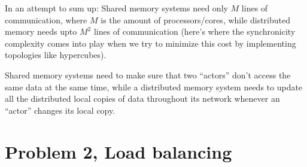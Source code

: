 \documentclass[fontsize=11pt, paper=a4, titlepage]{article}
\begin{document}
\begin{enumerate}[a)]
In an attempt to sum up: Shared memory systems need only $M$ lines of
communication, where $M$ is the amount of processors/cores, while distributed
memory needs upto $M^2$ lines of communication (here's where the synchronicity
complexity comes into play when we try to minimize this cost by implementing
topologies like hypercubes).

Shared memory systems need to make sure that two ``actors'' don't access the
same data at the same time, while a distributed memory system needs to update
all the distributed local copies of data throughout its network whenever an
``actor'' changes its local copy.

\end{enumerate}

\section{Problem 2, Load balancing}
\end{document}
